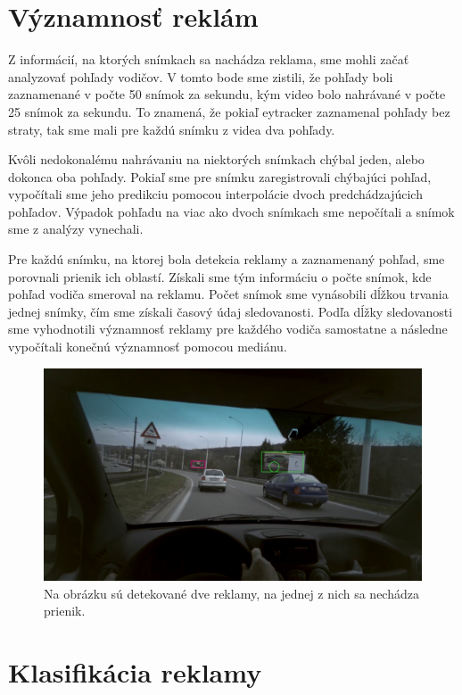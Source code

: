 \section{Významnosť reklám}

Z informácií, na ktorých snímkach sa nachádza reklama, sme mohli začať analyzovať pohľady vodičov. V tomto bode sme zistili, že pohľady boli zaznamenané v počte 50 snímok za sekundu, kým video bolo nahrávané v počte 25 snímok za sekundu. To znamená, že pokiaľ eytracker zaznamenal pohľady bez straty, tak sme mali pre každú snímku z videa dva pohľady.

Kvôli nedokonalému nahrávaniu na niektorých snímkach chýbal jeden, alebo dokonca oba pohľady. Pokiaľ sme pre snímku zaregistrovali chýbajúci pohľad, vypočítali sme jeho predikciu pomocou interpolácie dvoch predchádzajúcich pohľadov. Výpadok pohľadu na viac ako dvoch snímkach sme nepočítali a snímok sme z analýzy vynechali.

Pre každú snímku, na ktorej bola detekcia reklamy a zaznamenaný pohľad, sme porovnali prienik ich oblastí. Získali sme tým informáciu o počte snímok, kde pohľad vodiča smeroval na reklamu. Počet snímok sme vynásobili dĺžkou trvania jednej snímky, čím sme získali časový údaj sledovanosti. Podľa dĺžky sledovanosti sme vyhodnotili významnosť reklamy pre každého vodiča samostatne a následne vypočítali konečnú významnosť pomocou mediánu.

 \begin{figure}[ht]
     \centering
     \includegraphics[width=1\textwidth]{images/04/iou.jpg}
     \caption{Na obrázku sú detekované dve reklamy, na jednej z nich sa nechádza prienik.}
     \label{img:tracking}
 \end{figure}

\section{Klasifikácia reklamy}

